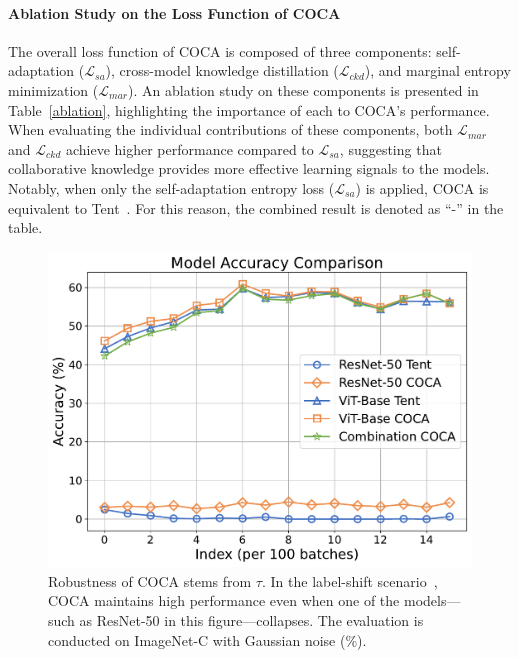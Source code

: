 \paragraph{Ablation Study on the Loss Function of COCA }
The overall loss function of COCA is composed of three components: self-adaptation ($\mathcal{L}_{sa}$), cross-model knowledge distillation ($\mathcal{L}_{ckd}$), and marginal entropy minimization ($\mathcal{L}_{mar}$). An ablation study on these components is presented in Table~\ref{ablation}, highlighting the importance of each to COCA's performance. When evaluating the individual contributions of these components, both $\mathcal{L}_{mar}$ and $\mathcal{L}_{ckd}$ achieve higher performance compared to $\mathcal{L}_{sa}$, suggesting that collaborative knowledge provides more effective learning signals to the models. Notably, when only the self-adaptation entropy loss ($\mathcal{L}_{sa}$) is applied, COCA is equivalent to Tent~\cite{wang2020tent}. For this reason, the combined result is denoted as ``-” in the table.

\begin{figure}[t]
\centering
    \includegraphics[width=0.85\linewidth]{sec/accuracy_comparison_updated_final.pdf}
    \vspace{-0.12in}
    \caption{Robustness of COCA stems from $\tau$. In the label-shift scenario~\cite{niu2023towards}, COCA maintains high performance even when one of the models—such as ResNet-50 in this figure—collapses. The evaluation is conducted on ImageNet-C with Gaussian noise (\%).} 
\label{lsrobust}
\vspace{-0.07in}
\end{figure}

